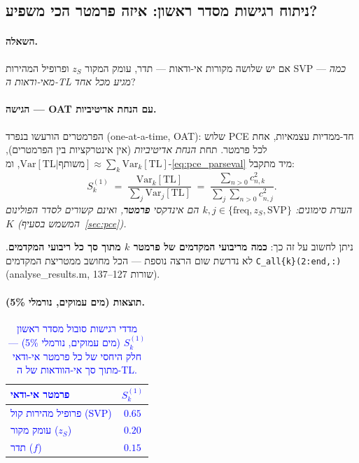 \documentclass[12pt,a4paper]{article}
\newcommand{\Var}{\mathrm{Var}}
\newcommand{\TL}{\mathrm{TL}}
\DeclareRobustCommand{\aiedit}[1]{\textcolor{blue}{#1}}
\begin{document}
\subsection{ניתוח רגישות מסדר ראשון: איזה פרמטר הכי משפיע?}
\label{sec:sensitivity}

\paragraph{השאלה.}
אם יש שלושה מקורות אי-ודאות — תדר, עומק המקור $z_S$ ופרופיל המהירות SVP —
\emph{כמה מאי-ודאות ה-TL מגיע מכל אחד}?

\paragraph{הגישה — OAT עם הנחת אדיטיביות.}
הפרמטרים הורעשו בנפרד (\textenglish{one-at-a-time, OAT}):
שלוש PCE חד-ממדיות עצמאיות, אחת לכל פרמטר.
תחת \emph{הנחת אדיטיביות} (אין אינטרקציות בין הפרמטרים),
$\Var[\TL|\text{משותף}] \approx \sum_k \Var_k[\TL]$,
ומ-\eqref{eq:pce_parseval} מיד מתקבל:
\begin{equation}
  S_k^{(1)}
  \;=\; \frac{\Var_k[\TL]}{\displaystyle\sum_{j} \Var_{j}[\TL]}
  \;=\; \frac{\displaystyle\sum_{n>0} c_{n,k}^2}{\displaystyle\sum_{j}\sum_{n>0} c_{n,j}^2}.
  \label{eq:sobol_1st}
\end{equation}
\noindent\small\textit{הערת סימונים: $k, j \in \{\text{freq}, z_S, \text{SVP}\}$ הם אינדקסי \textbf{פרמטר}, ואינם קשורים לסדר הפולינום $K$ (המשמש בסעיף~\ref{sec:pce}).}\normalsize

ניתן לחשוב על זה כך: \textbf{כמה מריבועי המקדמים של פרמטר $k$ מתוך סך כל ריבועי המקדמים}.
לא נדרשת שום הרצה נוספת —
הכל מחושב ממטריצת המקדמים 
\texttt{C\_all\{k\}(2:end,:)}
(\textenglish{analyse\_results.m}, שורות 127--137).

\paragraph{תוצאות (מים עמוקים, נורמלי 5\%{}).}
\aiedit{
\begin{table}[H]
  \centering
  \caption{מדדי רגישות סובול מסדר ראשון $S_k^{(1)}$ (מים עמוקים, נורמלי 5\%{}) —
           חלק היחסי של כל פרמטר אי-ודאי מתוך סך אי-הוודאות של ה-TL.}
  \label{tab:sobol_1st}
  \begin{tabular}{lc}
    \toprule
    \textbf{פרמטר אי-ודאי} & $S_k^{(1)}$ \\
    \midrule
    פרופיל מהירות קול (SVP) & $\mathbf{0.65}$ \\
    עומק מקור ($z_S$)        & $0.20$ \\
    תדר ($f$)                & $0.15$ \\
    \bottomrule
  \end{tabular}
\end{table}}
\end{document}
